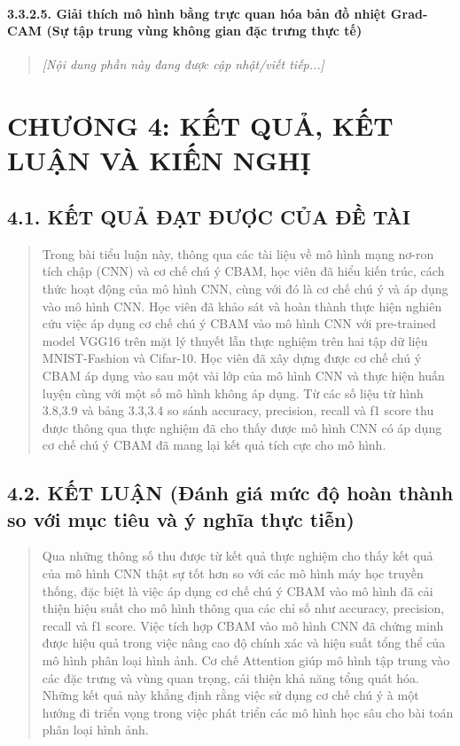 \documentclass[
]{article}
\begin{document}
\paragraph{3.3.2.5. Giải thích mô hình bằng trực quan hóa bản đồ nhiệt Grad-CAM (Sự tập trung vùng không gian đặc trưng thực tế)}\label{3-3-2-5-gradcam}
\begin{quote}
\emph{[Nội dung phần này đang được cập nhật/viết tiếp...]}
\end{quote}

\section{CHƯƠNG 4: KẾT QUẢ, KẾT LUẬN VÀ KIẾN NGHỊ}\label{chux1b0ux1a1ng-4-kux1ebft-quux1ea3-kux1ebft-luux1eadn-vuxe0-kiux1ebfn-nghux1ecb}

\subsection{4.1. KẾT QUẢ ĐẠT ĐƯỢC CỦA ĐỀ TÀI}\label{kux1ebft-quux1ea3}

\begin{quote}
Trong bài tiểu luận này, thông qua các tài liệu về mô hình mạng nơ-ron
tích chập (CNN) và cơ chế chú ý CBAM, học viên đã hiểu kiến trúc, cách
thức hoạt động của mô hình CNN, cùng với đó là cơ chế chú ý và áp dụng
vào mô hình CNN. Học viên đã khảo sát và hoàn thành thực hiện nghiên cứu
việc áp dụng cơ chế chú ý CBAM vào mô hình CNN với pre-trained model
VGG16 trên mặt lý thuyết lẫn thực nghiệm trên hai tập dữ liệu
MNIST-Fashion và Cifar-10. Học viên đã xây dựng được cơ chế chú ý CBAM
áp dụng vào sau một vài lớp của mô hình CNN và thực hiện huấn luyện cùng
với một số mô hình không áp dụng. Từ các số liệu từ hình 3.8,3.9 và bảng
3.3,3.4 so sánh accuracy, precision, recall và f1 score thu được thông
qua thực nghiệm đã cho thấy được mô hình CNN có áp dụng cơ chế chú ý
CBAM đã mang lại kết quả tích cực cho mô hình.
\end{quote}

\subsection{4.2. KẾT LUẬN (Đánh giá mức độ hoàn thành so với mục tiêu và ý nghĩa thực tiễn)}\label{kux1ebft-luux1eadn}

\begin{quote}
Qua những thông số thu được từ kết quả thực nghiệm cho thấy kết quả của
mô hình CNN thật sự tốt hơn so với các mô hình máy học truyền thống, đặc
biệt là việc áp dụng cơ chế chú ý CBAM vào mô hình đã cải thiện hiệu
suất cho mô hình thông qua các chỉ số như accuracy, precision, recall và
f1 score. Việc tích hợp CBAM vào mô hình CNN đã chứng minh được hiệu quả
trong việc nâng cao độ chính xác và hiệu suất tổng thể của mô hình phân
loại hình ảnh. Cơ chế Attention giúp mô hình tập trung vào các đặc trưng
và vùng quan trọng, cải thiện khả năng tổng quát hóa. Những kết quả này
khẳng định rằng việc sử dụng cơ chế chú ý à một hướng đi triển vọng
trong việc phát triển các mô hình học sâu cho bài toán phân loại hình
ảnh.
\end{quote}
\end{document}
